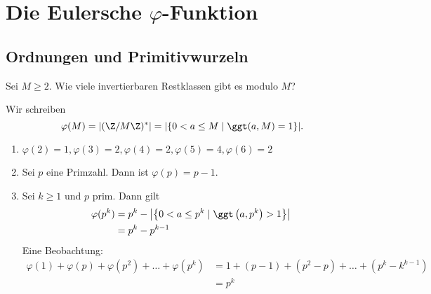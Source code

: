 \chapter{Die Eulersche $\varphi$-Funktion}

\section*{Ordnungen und Primitivwurzeln}

\begin{frage*}
	Sei $M \geq 2$. Wie viele invertierbaren Restklassen gibt es modulo $M$?
\end{frage*}

\begin{notat*}
	Wir schreiben
	\[ \varphi(M) = |(\Z/M\Z)^*| = |\{0 < a \leq M \mid \ggt(a,M) = 1\}|. \]
\end{notat*}

\begin{exmp*}
	\begin{enumerate}[label={\roman*})]
		\item $\varphi(2) = 1, \varphi(3)=2, \varphi(4)=2, \varphi(5)=4, \varphi(6)=2$\\
		\item Sei $p$ eine Primzahl. Dann ist $\varphi(p) = p-1$.
		\item Sei $k \geq 1$ und $p$ prim. Dann gilt
			\begin{align*}
				\varphi(p^k) &= p^k - \left|\left\{0 < a \leq p^k \mid \ggt\left(a,p^k\right)>1\right\}\right|\\
				&= p^k - p^{k-1}
			\end{align*}
			Eine Beobachtung:
			\begin{align*}
				\varphi(1) + \varphi(p) + \varphi(p^2) + \dots + \varphi(p^k) &= 1 + (p-1) + (p^2-p) + \dots + (p^k-k^{k-1}) \\
				&= p^k
			\end{align*}
	\end{enumerate}
\end{exmp*}

